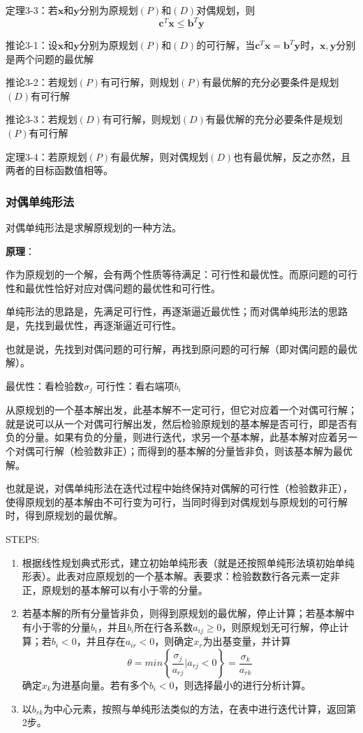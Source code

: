 \documentclass{book}
\begin{document}
定理3-3：若$\boldsymbol{x}$和$\boldsymbol{y}$分别为原规划$(P)$和$(D)$对偶规划，则
$$
\boldsymbol{c}^T\boldsymbol{x}\le \boldsymbol{b}^T\boldsymbol{y}
$$

推论3-1：设$\boldsymbol{x}$和$\boldsymbol{y}$分别为原规划$(P)$和$(D)$的可行解，当$\boldsymbol{c}^T\boldsymbol{x}= \boldsymbol{b}^T\boldsymbol{y}$时，$\boldsymbol{x},\boldsymbol{y}$分别是两个问题的最优解

推论3-2：若规划$(P)$有可行解，则规划$(P)$有最优解的充分必要条件是规划$(D)$有可行解

推论3-3：若规划$(D)$有可行解，则规划$(D)$有最优解的充分必要条件是规划$(P)$有可行解

定理3-4：若原规划$(P)$有最优解，则对偶规划$(D)$也有最优解，反之亦然，且两者的目标函数值相等。

\subsubsection{对偶单纯形法}

对偶单纯形法是求解原规划的一种方法。

\textbf{原理}：

作为原规划的一个解，会有两个性质等待满足：可行性和最优性。而原问题的可行性和最优性恰好对应对偶问题的最优性和可行性。

单纯形法的思路是，先满足可行性，再逐渐逼近最优性；而对偶单纯形法的思路是，先找到最优性，再逐渐逼近可行性。

也就是说，先找到对偶问题的可行解，再找到原问题的可行解（即对偶问题的最优解）。

最优性：看检验数$\sigma_j$
可行性：看右端项$b_i$

从原规划的一个基本解出发，此基本解不一定可行，但它对应着一个对偶可行解；就是说可以从一个对偶可行解出发，然后检验原规划的基本解是否可行，即是否有负的分量。如果有负的分量，则进行迭代，求另一个基本解，此基本解对应着另一个对偶可行解（检验数非正）；而得到的基本解的分量皆非负，则该基本解为最优解。

也就是说，对偶单纯形法在迭代过程中始终保持对偶解的可行性（检验数非正），使得原规划的基本解由不可行变为可行，当同时得到对偶规划与原规划的可行解时，得到原规划的最优解。

STEPS:
\begin{enumerate}
    \item 根据线性规划典式形式，建立初始单纯形表（就是还按照单纯形法填初始单纯形表）。此表对应原规划的一个基本解。表要求：检验数数行各元素一定非正，原规划的基本解可以有小于零的分量。
    \item 若基本解的所有分量皆非负，则得到原规划的最优解，停止计算；若基本解中有小于零的分量$b_i$，并且$b_i$所在行各系数$a_{ij}\ge0$，则原规划无可行解，停止计算；若$b_i<0$，并且存在$a_{ir}<0$，则确定$x_r$为出基变量，并计算$$\theta=min\left\{\frac{\sigma_j}{a_{rj}}|a_{rj}<0\right\}=\frac{\sigma_k}{a_{rk}}$$确定$x_k$为进基向量。若有多个$b_i<0$，则选择最小的进行分析计算。
    \item 以$b_{rk}$为中心元素，按照与单纯形法类似的方法，在表中进行迭代计算，返回第2步。
\end{enumerate}
\end{document}
